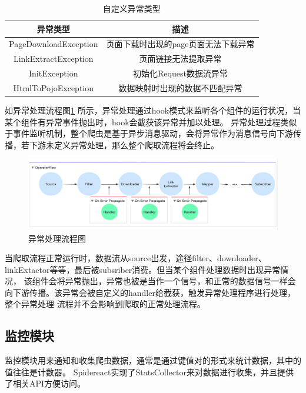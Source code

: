 \documentclass[master]{njuthesis}
\begin{document}
\begin{table}
\centering
\begin{tabular}{|c|c|}
\hline
异常类型 & 描述 \\
\hline
PageDownloadException & 页面下载时出现的page页面无法下载异常 \\
LinkExtractException & 页面链接无法提取异常 \\
InitException & 初始化Request数据流异常 \\
HtmlToPojoException & 数据映射时出现的数据不匹配异常 \\
\hline
\end{tabular}
\caption{自定义异常类型}\label{table:exception}
\end{table}
如异常处理流程图\ref{fig:error} 所示，异常处理通过hook模式来监听各个组件的运行状况，当某个组件有异常事件抛出时，hook会截获该异常并加以处理。
异常处理过程类似于事件监听机制，整个爬虫是基于异步消息驱动，会将异常作为消息信号向下游传播，若下游未定义异常处理，那么整个爬取流程将会终止。

\begin{figure}
\centering
\includegraphics[width=1\textwidth]{pic/error-handling.png}
\caption{异常处理流程图}\label{fig:error}
\end{figure}
当爬取流程正常运行时，数据流从source出发，途径filter、downloader、linkExtactor等等，最后被subsriber消费。但当某个组件处理数据时出现异常情况，
该组件会将异常抛出，异常也被是当作一个信号，和正常的数据信号一样会向下游传播。该异常会被自定义的handler给截获，触发异常处理程序进行处理，整个异常处理
流程并不会影响到爬取的正常处理流程。

\subsection{监控模块}
监控模块用来通知和收集爬虫数据，通常是通过键值对的形式来统计数据，其中的值往往是计数器。
Spidereact实现了StatsCollector来对数据进行收集，并且提供了相关API方便访问。
\end{document}
